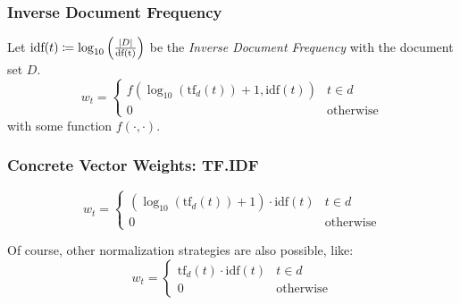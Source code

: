             \subsubsection{Inverse Document Frequency} %
            	Let \( \text{idf}(t) \coloneqq \log_{10}\Big(\frac{\abs{D}}{\text{df(t)}}\Big) \) be the \textit{Inverse Document Frequency} with the document set \(D\).
           		\begin{equation*}
               		w_t =
               			\begin{cases}
	               			f(\log_{10}(\text{tf}_d(t)) + 1, \text{idf}(t)) & t \in d \\
	               			0 & \text{otherwise}
               			\end{cases}
           		\end{equation*}
           		with some function \( f(\cdot, \cdot) \).

            \subsubsection{Concrete Vector Weights: TF.IDF} %
                \begin{equation*}
                    w_t =
                    	\begin{cases}
	                    	(\log_{10}(\text{tf}_d(t)) + 1) \cdot \text{idf}(t) & t \in d \\
	                    	0 & \text{otherwise}
                    	\end{cases}
                \end{equation*}
                
                Of course, other normalization strategies are also possible, like:
                \begin{equation*}
					w_t =
						\begin{cases}
							\text{tf}_d(t) \cdot \text{idf}(t) & t \in d \\
							0 & \text{otherwise}
						\end{cases}
				\end{equation*}

